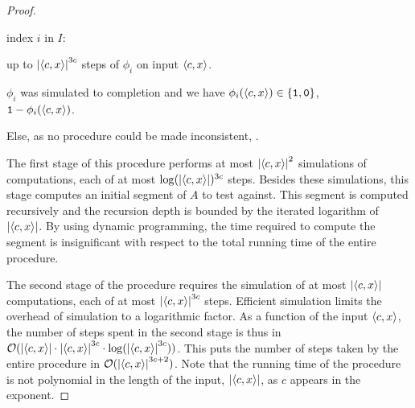 \begin{proof}
\begin{codelisting}
\begin{codelisting}
    \item
       index $i$ in $I$:
      \begin{codelisting}
      \item
         up to $\length{\pair{c}{x}}^{3c}$ steps of $\phi_i$ on input $\pair{c}{x}$.
      \item
         $\phi_i$ was simulated to completion and we have $\phi_i(\pair{c}{x}) \in \{\bits{1}, \bits{0}\}$,
        \\\-\quad {} $\bits{1} - \phi_i(\pair{c}{x})$.
      \end{codelisting}
    \item
      Else, as no procedure could be made inconsistent,  .
    \end{codelisting}
  \end{codelisting}

  The first stage of this procedure performs at most ${\lvert{\langle c, x\rangle}\rvert}^2$ simulations of computations, each of at most $\log({\lvert{\langle c, x\rangle}\rvert})^{3c}$ steps.
  Besides these simulations, this stage computes an initial segment of $A$ to test against.
  This segment is computed recursively and the recursion depth is bounded by the iterated logarithm of ${\lvert{\langle c, x\rangle}\rvert}$.
  By using dynamic programming, the time required to compute the segment is insignificant with respect to the total running time of the entire procedure.

  The second stage of the procedure requires the simulation of at most ${\lvert{\langle c, x\rangle}\rvert}$ computations, each of at most ${\lvert{\langle c, x\rangle}\rvert}^{3c}$ steps.
  Efficient simulation \parencite{arora2009computational} limits the overhead of simulation to a logarithmic factor.
  As a function of the input ${\langle c, x\rangle}$, the number of steps spent in the second stage is thus in $\operatorname{\mathcal{O}}({\lvert{\langle c, x\rangle}\rvert} \cdot {\lvert{\langle c, x\rangle}\rvert}^{3c} \cdot \log({\lvert{\langle c, x\rangle}\rvert}^{3c}))$.
  This puts the number of steps taken by the entire procedure in $\operatorname{\mathcal{O}}({\lvert{\langle c, x\rangle}\rvert}^{3c + 2})$.
  Note that the running time of the procedure is not polynomial in the length of the input, ${\lvert{\langle c, x\rangle}\rvert}$, as $c$ appears in the exponent.


\end{proof}
